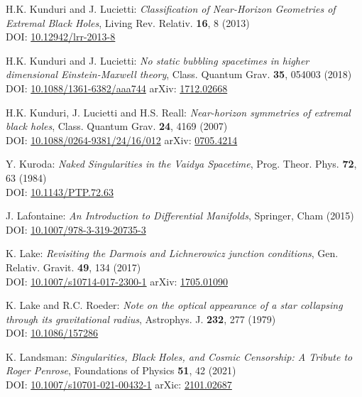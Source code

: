 \begin{thebibliography}{123}
H.K. Kunduri and J. Lucietti:
{\em Classification of Near-Horizon Geometries of Extremal Black Holes},
Living Rev. Relativ. {\bf 16}, 8 (2013)\\
DOI: \href{https://doi.org/10.12942/lrr-2013-8}{10.12942/lrr-2013-8}

H.K. Kunduri and J. Lucietti:
{\em No static bubbling spacetimes in higher dimensional Einstein-Maxwell theory},
Class. Quantum Grav. {\bf 35}, 054003 (2018)\\
DOI: \href{https://doi.org/10.1088/1361-6382/aaa744}{10.1088/1361-6382/aaa744}\hfill
arXiv: \href{https://arxiv.org/abs/1712.02668}{1712.02668}

H.K. Kunduri, J. Lucietti and H.S. Reall:
{\em Near-horizon symmetries of extremal black holes},
Class. Quantum Grav. {\bf 24}, 4169 (2007)\\
DOI: \href{https://doi.org/10.1088/0264-9381/24/16/012}{10.1088/0264-9381/24/16/012}\hfill
arXiv: \href{https://arxiv.org/abs/0705.4214}{0705.4214}

Y. Kuroda:
{\em Naked Singularities in the Vaidya Spacetime},
Prog. Theor. Phys. {\bf 72}, 63 (1984)\\
DOI: \href{https://doi.org/10.1143/PTP.72.63}{10.1143/PTP.72.63}

J. Lafontaine: {\em An Introduction to Differential Manifolds},
Springer, Cham (2015)\\
DOI: \href{https://doi.org/10.1007/978-3-319-20735-3}{10.1007/978-3-319-20735-3}

K. Lake:
{\em Revisiting the Darmois and Lichnerowicz junction conditions},
Gen. Relativ. Gravit. {\bf 49}, 134 (2017)\\
DOI: \href{https://doi.org/10.1007/s10714-017-2300-1}{10.1007/s10714-017-2300-1}\hfill
arXiv: \href{https://arxiv.org/abs/1705.01090}{1705.01090}

K. Lake and R.C. Roeder:
{\em Note on the optical appearance of a star collapsing through its gravitational radius},
Astrophys. J. {\bf 232}, 277 (1979)\\
DOI: \href{https://doi.org/10.1086/157286}{10.1086/157286}

K. Landsman:
{\em Singularities, Black Holes, and Cosmic Censorship:
A Tribute to Roger Penrose},
Foundations of Physics {\bf 51}, 42 (2021)\\
DOI: \href{https://doi.org/10.1007/s10701-021-00432-1}{10.1007/s10701-021-00432-1}\hfill
arXic: \href{https://arxiv.org/abs/2101.02687}{2101.02687}


\end{thebibliography}
